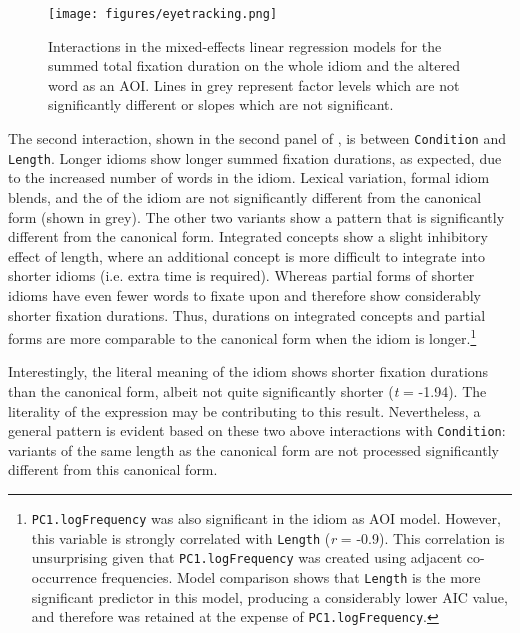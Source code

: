 \documentclass[output=paper,modfonts,nonflat]{langsci/langscibook}
\begin{document}
\newpage 

\begin{figure} 
\texttt{[image: figures/eyetracking.png]}
\caption{Interactions in the mixed-effects linear regression models for the summed total fixation duration on the whole idiom and the altered word as an AOI. Lines in grey represent factor levels which are not significantly different or slopes which are not significant.}
\label{plotEyetracking}
\end{figure}


The second interaction, shown in the second panel of , is between \texttt{Condition} and \texttt{Length}. Longer idioms show longer summed fixation durations, as expected, due to the increased number of words in the idiom. Lexical variation, formal idiom blends, and the  of the idiom are not significantly different from the canonical form (shown in grey). The other two variants show a pattern that is significantly different from the canonical form. Integrated concepts show a slight inhibitory effect of length, where an additional concept is more difficult to integrate into shorter idioms (i.e. extra time is required). Whereas partial forms of shorter idioms have even fewer words to fixate upon and therefore show considerably shorter fixation durations. Thus, durations on integrated concepts and partial forms are more comparable to the canonical form when the idiom is longer.\footnote{\texttt{PC1.logFrequency} was also significant in the idiom as AOI model. However, this variable is strongly correlated with \texttt{Length} (\textit{r} = -0.9). This correlation is unsurprising given that \texttt{PC1.logFrequency} was created using adjacent co-occurrence frequencies. Model comparison shows that \texttt{Length} is the more significant predictor in this model, producing a considerably lower AIC value, and therefore was retained at the expense of \texttt{PC1.logFrequency}.}

Interestingly, the literal meaning of the idiom shows shorter fixation durations than the canonical form, albeit not quite significantly shorter (\textit{t} = -1.94). The literality of the expression \citep{TitoneConnine1994b} may be contributing to this result. Nevertheless, a general pattern is evident based on these two above interactions with \texttt{Condition}: variants of the same length as the canonical form are not processed significantly different from this canonical form.
\end{document}
